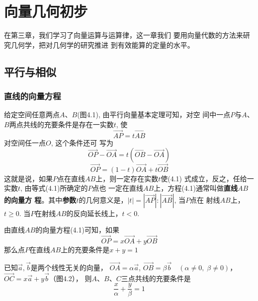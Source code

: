 \chapter{向量几何初步}
在第三章，我们学习了向量运算与运算律，这一章我们
要用向量代数的方法来研究几何学，把对几何学的研究推进
到有效能算的定量的水平。

\section{平行与相似}
\subsection{直线的向量方程}
\begin{figure}[htp]
    \centering
{}
    \caption{}
\end{figure}

给定空间任意两点$A$、$B$(图4.1), 由平行向量基本定理可知，对空
间中一点$P$与$A$、$B$两点共线的充要条件是存在一实数$t$, 使
\[\Vec{AP}=t\Vec{AB}\]
对空间任一点$O$, 这个条件还可
写为
\[\Vec{OP}-\Vec{OA}=t\left(\Vec{OB}-\Vec{OA}\right)\]
\begin{equation}
    \Vec{OP}=(1-t)\Vec{OA}+t\Vec{OB}
\end{equation}
这就是说，如果$P$点在直线$AB$上，则一定存在实数$t$使(4.1)
式成立，反之，任给一实数$t$, 由等式(4.1)所确定的$P$点也
一定在直线$AB$上，方程(4.1)通常叫做\textbf{直线$AB$的向量方
程}。其中\textbf{参数}$t$的几何意义是，$|t|=|\Vec{AP}|:|\Vec{AB}|$, 当$P$点在
射线$AB$上，$t\ge 0$. 当$P$在射线$AB$的反向延长线上，$t<0$.

由直线$AB$的向量方程(4.1)可知，如果
\[\Vec{OP}=x\Vec{OA}+y\Vec{OB}\]
那么点$P$在直线$AB$上的充要条件是$x+y=1$

\begin{example}
    已知$\vec{a},\vec{b}$是两个线性无关的向量，
$\Vec{OA}=\alpha\vec{a}$, $\Vec{OB}=\beta\vec{b}\quad (\alpha\ne 0,\;\beta\ne 0)$，$\Vec{OC}=x\vec{a}+y\vec{b}$（图4.2），
则$A$、$B$、$C$三点共线的充要条件是
\[\frac{x}{\alpha}+\frac{y}{\beta}=1\]
\end{example}

